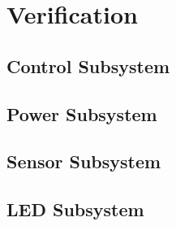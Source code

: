\section{Verification}

\subsection{Control Subsystem}
\subsection{Power Subsystem}
\subsection{Sensor Subsystem}
\subsection{LED Subsystem}
